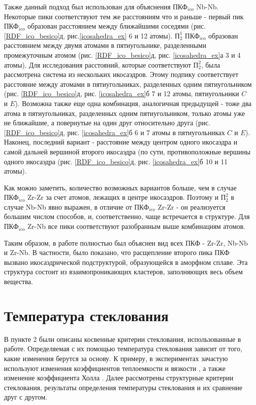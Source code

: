 Также данный подход был использован для объяснения $\text{ПКФ}_{ico}$ Nb-Nb. Некоторые пики соответствуют тем же расстояниям что и раньше -  первый пик $\text{ПКФ}_{ico}$ образован расстоянием между ближайшими соседями (рис.\ref{RDF_ico_besico}д, рис.\ref{icosahedra_ex} 6 и 12 атомы). $\text{П}_2^1$ $\text{ПКФ}_{ico}$ образован расстоянием между двумя атомами в пятиугольнике, разделенными промежуточным атомом (рис. \ref{RDF_ico_besico}д, рис. \ref{icosahedra_ex}а 3 и 4 атомы). Для исследования расстояний, которые соответствуют  $\text{П}_2^2$, была рассмотрена система из нескольких икосаэдров. Этому подпику соответствует расстояние между  атомами в пятиугольниках, разделенных одним пятиугольником (рис. \ref{RDF_ico_besico}д, рис. \ref{icosahedra_ex}б 7 и 12 атомы, пятиугольники $C$ и $E$). Возможна также еще одна комбинация, аналогичная предыдущей - тоже два атома в пятиугольниках, разделенных одним пятиугольником,  только атомы уже не ближайшие, а повернутые на один друг относительно друга (рис. \ref{RDF_ico_besico}д, рис. \ref{icosahedra_ex}б  6 и 7 атомы в пятиугольниках $C$ и $E$). Наконец, последний вариант - расстояние между центром одного икосаэдра и самой дальней вершиной второго икосаэдра (по сути, противоположные вершины одного икосаэдра (рис. \ref{RDF_ico_besico}д, рис. \ref{icosahedra_ex}б 10 и 11 атомы). 


Как можно заметить, количество возможных вариантов больше, чем в случае $\text{ПКФ}_{ico}$ Zr-Zr за счет атомов, лежащих в центре икосаэдров. Поэтому и $\text{П}_2^2$ в случае  Nb-Nb явно выражен, в отличие от $\text{ПКФ}_{ico}$ Zr-Zr - он реализуется большим числом способов, и, соответственно, чаще встречается в структуре. Для $\text{ПКФ}_{ico}$ Zr-Nb все пики соответствуют разобранным выше комбинациям атомов.


Таким образом, в работе полностью был объяснен вид всех  ПКФ - Zr-Zr, Nb-Nb и Zr-Nb. В частности, было показано, что расщепление второго пика ПКФ вызвано  икосаэдрической подструктурой, образующейся в аморфном сплаве. Эта структура состоит из взаимопроникающих кластеров, заполняющих весь объем вещества.

\section{Температура стеклования}
В пункте 2 были описаны косвенные критерии стеклования, использованные в работе. Определяемая с их помощью температура стеклования зависит от того, какие изменения берутся за основу. К примеру, в экспериментах зачастую используют изменения коэффициентов теплоемкости \cite{tropin2015heat} и вязкости \cite{konstantinova2009kinematicheskaya}, а также изменение коэффициента Холла \cite{Kuzmenko}. Далее рассмотрены структурные критерии стеклования,  результаты определения температуры стеклования и их сравнение друг с другом.

